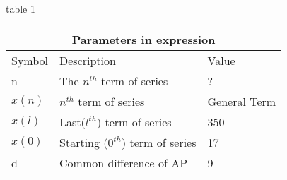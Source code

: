 \setlength{\arrayrulewidth}{0.3mm}
\setlength{\tabcolsep}{15pt}
\renewcommand{\arraystretch}{1.5}

table 1\\

\begin{tabular}{ |p{1cm}|p{3cm}|p{1cm}| }
\hline
\multicolumn{3}{|c|}{Parameters in expression}\\
\hline
Symbol & Description & Value\\
\hline
n & The $n^{th}$ term of series & ?\\
\hline
$x(n)$ & $n^{th}$ term of series & General Term\\
\hline
$x(l)$ & Last($l^{th}$) term of series & 350\\
\hline
$x(0)$ & Starting ($0^{th}$) term of series & 17 \\
\hline
d & Common difference of AP & 9\\
\hline
\end{tabular}


